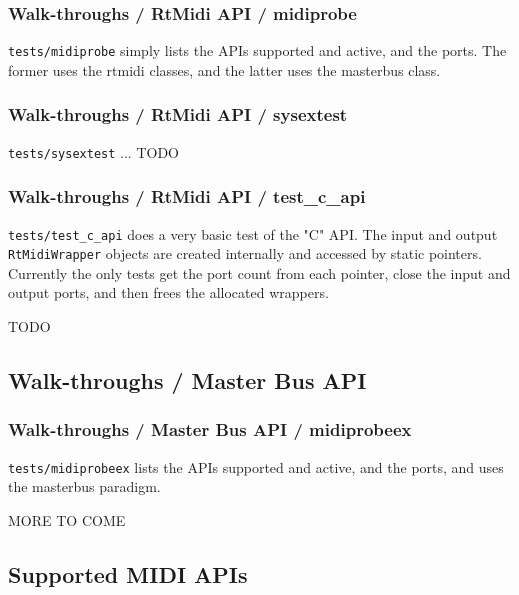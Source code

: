 \subsubsection{Walk-throughs / RtMidi API / midiprobe}
\label{sec:walkthroughs_rtmidi_api_midiprobe}

   \texttt{tests/midiprobe}
   simply lists the APIs supported and active,
   and the ports.
   The former uses the rtmidi classes, and
   the latter uses the masterbus class.

\subsubsection{Walk-throughs / RtMidi API / sysextest}
\label{sec:walkthroughs_rtmidi_api_sysextest}

   \texttt{tests/sysextest} ... TODO

\subsubsection{Walk-throughs / RtMidi API / test\_c\_api}
\label{sec:walkthroughs_rtmidi_api_test_c_api}

   \texttt{tests/test\_c\_api} does a very basic test of the
   "C" API.
   The input and output
   \texttt{RtMidiWrapper} objects are created internally and
   accessed by static pointers.
   Currently the only tests get the port count from each pointer,
   close the input and output ports, and then frees the
   allocated wrappers.

   TODO

\subsection{Walk-throughs / Master Bus API}
\label{subsec:walkthroughs_master_bus_api}

\subsubsection{Walk-throughs / Master Bus API / midiprobeex}
\label{sec:walkthroughs_rtmidi_api_midiprobeex}

   \texttt{tests/midiprobeex} lists the APIs supported and active,
   and the ports, and uses the masterbus paradigm.

MORE TO COME


\subsection{Supported MIDI APIs}
\label{subsec:supported_apis}

